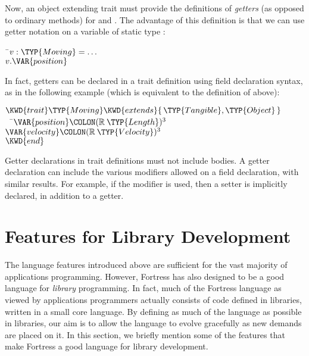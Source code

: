Now, an object extending trait  must provide the definitions of
\emph{getters} (as opposed to ordinary methods)
for  and .
The advantage of this definition is that we can use getter
notation on a variable of static type :

\begin{Fortress}
{\tt~}\pushtabs\=\+\( v \mathrel{\mathtt{:}} \TYP{Moving} = \ldots\)\\
\( v.\VAR{position}\)\-\\\poptabs
\end{Fortress}

In fact, getters can be declared in a trait definition using field declaration syntax, as in the following example
(which is equivalent to the definition of  above):

\begin{Fortress}
\(\KWD{trait} \TYP{Moving} \KWD{extends} \{\,\TYP{Tangible}, \TYP{Object}\,\}\)\\
{\tt~~}\pushtabs\=\+\(  \VAR{position}\COLON (\mathbb{R}\mskip 4mu plus 4mu\TYP{Length})^{3}\)\\
\(  \VAR{velocity}\COLON (\mathbb{R}\mskip 4mu plus 4mu\TYP{Velocity})^{3}\)\-\\\poptabs
\(\KWD{end}\)
\end{Fortress}

Getter declarations in trait definitions must not include bodies.
A getter declaration can include the various modifiers
allowed on a field declaration, with similar results.
For example, if the modifier  is used, then a
setter is implicitly declared, in addition to a getter.

\section{Features for Library Development}
The language features introduced above are sufficient for the vast majority of applications programming. However, Fortress
has also designed to be a good language for \emph{library} programming. In fact, much of the Fortress language as viewed
by applications programmers actually consists of code defined in libraries, written in a small core language. By defining as
much of the language as possible in libraries, our aim is to allow the language to evolve gracefully as new demands are placed on it.
In this section, we briefly mention some of the features that make Fortress a good language for library development.


